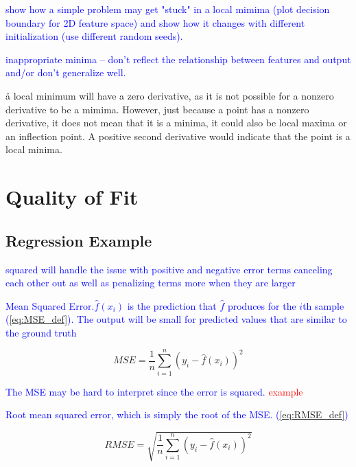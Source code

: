 \textcolor{blue}{show how a simple problem may get "stuck" in a local mimima (plot decision boundary for 2D feature space) and show how it changes with different initialization (use different random seeds). }

\textcolor{blue}{{inappropriate minima} -- don't reflect the relationship between features and output and/or don't generalize well.}

\r{a local minimum will have a zero derivative, as it is not possible for a nonzero derivative to be a mimima.  However, just because a point has a nonzero derivative, it does not mean that it is a minima, it could also be local maxima or an inflection point. A positive second derivative would indicate that the point is a local minima.}

\section{Quality of Fit}


\subsection{Regression Example}


\textcolor{blue}{squared will handle the issue with positive and negative error terms canceling each other out as well as penalizing terms more when they are larger}

\textcolor{blue}{Mean Squared Error.$\hat{f}(x_i)$ is the prediction that $\hat{f}$ produces for the $i$th sample (\ref{eq:MSE_def}). The output will be small for predicted values that are similar to the ground truth}

\begin{equation}
{MSE = \frac{1}{n}\sum_{i=1}^{n}(y_i - \hat{f}(x_i))^2}
\label{eq:MSE_def}
\end{equation}

\textcolor{blue}{The MSE may be hard to interpret since the error is squared. \textcolor{red}{example}}

\textcolor{blue}{Root mean squared error, which is simply the root of the MSE. (\ref{eq:RMSE_def})}

\begin{equation}
{RMSE = \sqrt{\frac{1}{n}\sum_{i=1}^{n}(y_i - \hat{f}(x_i))^2}}
\label{eq:RMSE_def}
\end{equation}


